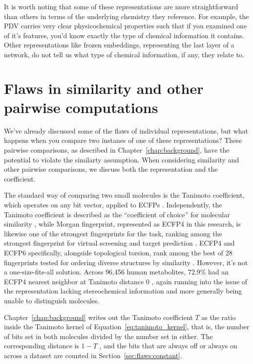It is worth noting that some of these representations are more straightforward than others in terms of the underlying chemistry they reference. For example, the PDV carries very clear physicochemical properties such that if you examined one of it's features, you'd know exactly the type of chemical information it contains. Other representations like frozen embeddings, representing the last layer of a network, do not tell us what type of chemical information, if any, they relate to. 


\section{Flaws in similarity and other pairwise computations}\label{sec:flaws:similarity} %

We've already discussed some of the flaws of individual representations, but what happens when you compare two instanes of one of these representations? These pairwise comparisons, as described in Chapter~\ref{chap:background}, have the potential to violate the similarty assumption. When considering similarity and other pairwise comparisons, we discuss both the representation and the coefficient.  


The standard way of comparing two small molecules is the Tanimoto coefficient, which operates on any bit vector, applied to ECFPs \citep{LopezPerez2024}. Independently, the Tanimoto coefficient is described as the ``coefficient of choice'' for molecular similarity \citep{Bajusz2015}, while Morgan fingerprint, represented as ECFP4 in this research, is likewise one of the strongest fingerprints for the task, ranking among the strongest fingerprint for virtual screening and target prediction \citep{Capecchi2020}. ECFP4 and ECFP6 specifically, alongside topological torsion, rank among the best of 28 fingerprints tested for ordering diverse structures by similarity \citep{OBoyle2016}. However, it's not a one-size-fits-all solution. Across 96,456 human metabolites, 72.9\% had an ECFP4 nearest neighbor at Tanimoto distance 0 \citep{Capecchi2020}, again running into the issue of the representation lacking stereochemical information and more generally being unable to distinguish molecules. 

Chapter~\ref{chap:background} writes out the Tanimoto coefficient $T$ as the ratio inside the Tanimoto kernel of Equation~\ref{eq:tanimoto_kernel}, that is, the number of bits set in both molecules divided by the number set in either. The corresponding distance is $1-T$ \citep{Bajusz2015}, and the bits that are always off or always on across a dataset are counted in Section~\ref{sec:flaws:constant}.


